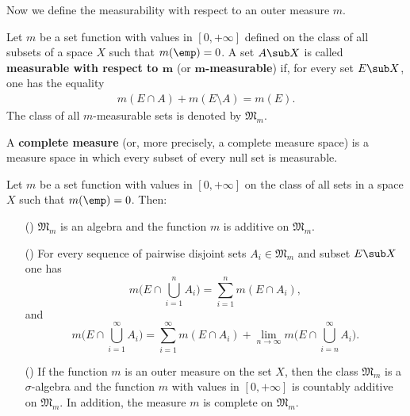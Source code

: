 Now we define the measurability with respect to an outer measure $m$.
\begin{definition}\label{measure measurable def}
Let $m$ be a set function with values in $[0,+\infty]$ defined on the class of all subsets of a space $X$ such that $m(\emp)=0$. A set $A\sub X$ is called \textbf{measurable with respect to $\bm{m}$} (or \textbf{$\bm{m}$-measurable}) if, for every set $E\sub X$, one has the equality
\begin{align}\label{Caratheodory condition}
m(E\cap A)+m(E\setminus A)=m(E).
\end{align}
The class of all $m$-measurable sets is denoted by $\mathfrak{M}_m$.
\end{definition}
A \textbf{complete measure} (or, more precisely, a complete measure space) is a measure space in which every subset of every null set is measurable.
\begin{theorem}\label{measure Caratheodory thm}
Let $m$ be a set function with values in $[0,+\infty]$ on the class of all sets in a space $X$ such that $m(\emp)=0$. Then:
\begin{itemize}
\item[(\rmnum{1})] $\mathfrak{M}_m$ is an algebra and the function $m$ is additive on $\mathfrak{M}_m$.
\item[(\rmnum{2})] For every sequence of pairwise disjoint sets $A_i\in\mathfrak{M}_m$ and subset $E\sub X$ one has
\[m\Big(E\cap\bigcup_{i=1}^{n}A_i\Big)=\sum_{i=1}^{n}m(E\cap A_i),\]
and
\[m\Big(E\cap\bigcup_{i=1}^{\infty}A_i\Big)=\sum_{i=1}^{\infty}m(E\cap A_i)+\lim_{n\to\infty}m\Big(E\cap\bigcup_{i=n}^{\infty}A_i\Big).\] 
\item[(\rmnum{3})] If the function $m$ is an outer measure on the set $X$, then the class $\mathfrak{M}_m$ is a $\sigma$-algebra and the function $m$ with values in $[0,+\infty]$ is countably additive on $\mathfrak{M}_m$. In addition, the measure $m$ is complete on $\mathfrak{M}_m$.
\end{itemize}
\end{theorem}
